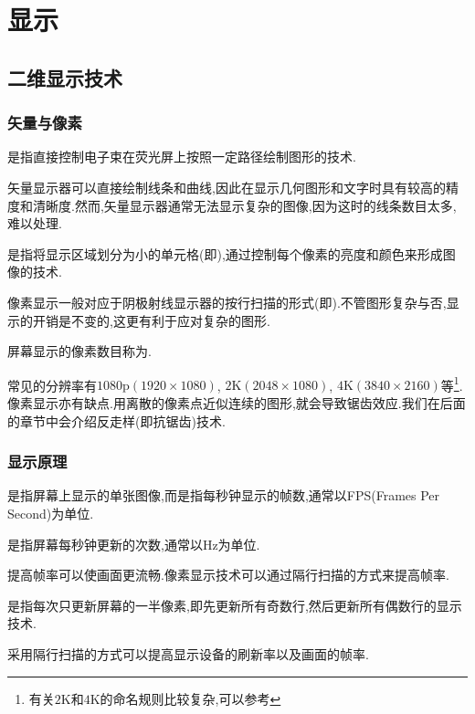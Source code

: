 \documentclass{ctexart}
\begin{document}
\section{显示}
\subsection{二维显示技术}
\subsubsection{矢量与像素}
\begin{definition}[矢量显示]
    是指直接控制电子束在荧光屏上按照一定路径绘制图形的技术.
\end{definition}
矢量显示器可以直接绘制线条和曲线,因此在显示几何图形和文字时具有较高的精度和清晰度.然而,矢量显示器通常无法显示复杂的图像,因为这时的线条数目太多,难以处理.
\begin{definition}[像素显示]
    是指将显示区域划分为小的单元格(即),通过控制每个像素的亮度和颜色来形成图像的技术.
\end{definition}
像素显示一般对应于阴极射线显示器的按行扫描的形式(即).不管图形复杂与否,显示的开销是不变的,这更有利于应对复杂的图形.
\begin{definition}[分辨率]
    屏幕显示的像素数目称为.
\end{definition}
常见的分辨率有$1080\text{p}(1920\times1080)$, $2\text{K}(2048\times1080)$, $4\text{K}(3840\times2160)$等\footnote{有关$2\text{K}$和$4\text{K}$的命名规则比较复杂,可以参考}.\\
\indent 像素显示亦有缺点.用离散的像素点近似连续的图形,就会导致锯齿效应.我们在后面的章节中会介绍反走样(即抗锯齿)技术.
\subsubsection{显示原理}
\begin{definition}[帧与帧率]
    是指屏幕上显示的单张图像,而是指每秒钟显示的帧数,通常以FPS(Frames Per Second)为单位.
\end{definition}
\begin{definition}[刷新率]
    是指屏幕每秒钟更新的次数,通常以Hz为单位.
\end{definition}
提高帧率可以使画面更流畅.像素显示技术可以通过隔行扫描的方式来提高帧率.
\begin{definition}[隔行扫描]
    是指每次只更新屏幕的一半像素,即先更新所有奇数行,然后更新所有偶数行的显示技术.
\end{definition}
采用隔行扫描的方式可以提高显示设备的刷新率以及画面的帧率.
\end{document}
